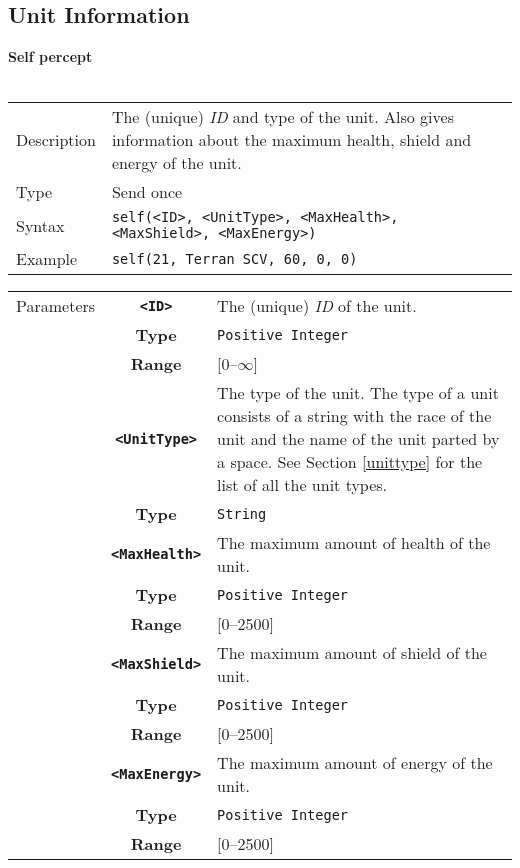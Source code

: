 \subsection{Unit Information}
\textbf{Self percept}\\
\\
\begin{tabularx}{\textwidth}{lX}
 Description & The (unique) \textit{ID} and type of the unit. Also gives information about the maximum health, shield and energy of the unit. \\
 Type & Send once \\
 Syntax & \verb|self(<ID>, <UnitType>, <MaxHealth>, <MaxShield>, <MaxEnergy>)| \\
 Example & \verb|self(21, Terran SCV, 60, 0, 0)|   \\   
 \end{tabularx}
 \begin{tabularx}{\textwidth}{l | c | p{8cm}|}
 \cline{2-3} 
 Parameters & \textbf{\verb|<ID>|} & The (unique) \textit{ID} of the unit.\\
            & \textbf{Type} & \verb|Positive Integer| \\
            & \textbf{Range} & [0--$\infty$] \\
            \cline{2-3} 
            & \textbf{\verb|<UnitType>|} & The type of the unit. The type of a unit consists of a string with the race of the unit and the name of the unit parted by a space. See Section \ref{unittype} for the list of all the unit types. \\
            & \textbf{Type} & \verb|String| \\
            \cline{2-3} 
            & \textbf{\verb|<MaxHealth>|} & The maximum amount of health of the unit.\\
            & \textbf{Type} & \verb|Positive Integer| \\
            & \textbf{Range} & [0--2500] \\
            \cline{2-3} 
            & \textbf{\verb|<MaxShield>|} & The maximum amount of shield of the unit.\\
            & \textbf{Type} & \verb|Positive Integer| \\
            & \textbf{Range} & [0--2500] \\
            \cline{2-3} 
            & \textbf{\verb|<MaxEnergy>|} & The maximum amount of energy of the unit.\\
            & \textbf{Type} & \verb|Positive Integer| \\
            & \textbf{Range} & [0--2500] \\
            \cline{2-3} 
\end{tabularx}
